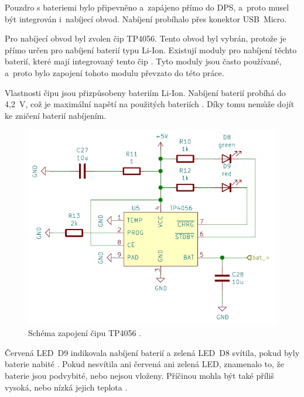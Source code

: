   Pouzdro s bateriemi bylo připevněno a~zapájeno přímo do DPS, a~proto musel být integrován i~nabíjecí obvod. Nabíjení probíhalo přes konektor 
  USB~Micro.

  Pro nabíjecí obvod byl zvolen čip TP4056. Tento obvod byl vybrán, protože je přímo určen pro nabíjení baterií typu Li-Ion. Existují 
  moduly pro nabíjení těchto baterií, které mají integrovaný tento čip \cite{Nabijeci_modul}. Tyto moduly jsou často používané, a~proto 
  bylo zapojení tohoto modulu převzato do této práce. 

  Vlastnosti čipu jsou přizpůsobeny bateriím Li-Ion. Nabíjení baterií probíhá do 4,2~V, což je maximální napětí na použitých 
  bateriích \cite{18650} \cite{TP4056_datasheet}. Díky tomu nemůže dojít ke zničení baterií nabíjením.

  \begin{figure}[!h]
    \begin{center}
      \includegraphics[scale=0.6]{obrazky/TP4056_schema.png}
    \end{center}
    \caption[Schéma zapojení čipu TP4056 \cite{TP4056_datasheet}]{Schéma zapojení čipu TP4056 \cite{TP4056_datasheet}.}
  \end{figure}

  Červená LED~D9 indikovala nabíjení baterií a  zelená LED~D8 svítila, pokud byly baterie nabité \cite{TP4056_datasheet}. 
  Pokud nesvítila ani červená ani zelená LED, znamenalo to, že baterie jsou podvybité, nebo nejsou vloženy. Příčinou mohla být také příliš vysoká, 
  nebo nízká jejich teplota \cite{TP4056_datasheet}.

